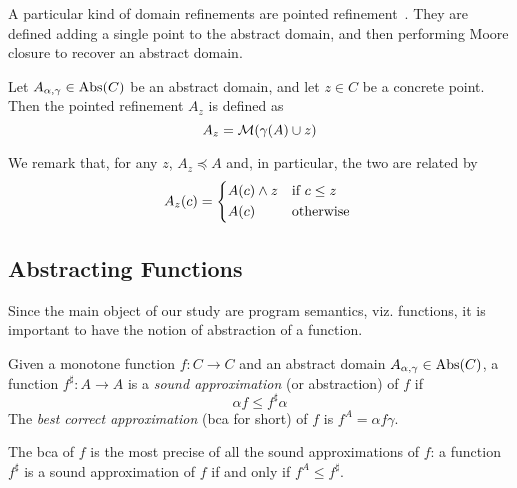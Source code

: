 A particular kind of domain refinements are pointed refinement~\cite{BGGR22}. They are defined adding a single point to the abstract domain, and then performing Moore closure to recover an abstract domain.
\begin{definition}
	Let $A_{\alpha, \gamma} \in \text{\normalfont Abs}(C)$ be an abstract domain, and let $z \in C$ be a concrete point. Then the pointed refinement $A_z$ is defined as
	\[
	A_z = \mathcal{M}(\gamma(A) \cup z)
	\]
\end{definition}
We remark that, for any $z$, $A_z \preceq A$ and, in particular, the two are related by
\[
A_z(c) = \begin{cases*}
	A(c) \wedge z & if $c \le z$ \\
	A(c)          & otherwise
\end{cases*}
\]

\subsection{Abstracting Functions}
Since the main object of our study are program semantics, viz. functions, it is important to have the notion of abstraction of a function.
\begin{definition}
	Given a monotone function $f : C \rightarrow C$ and an abstract domain $A_{\alpha, \gamma} \in \text{\normalfont Abs}(C)$, a function $f^{\sharp} : A \rightarrow A$ is a \emph{sound approximation} (or abstraction) of $f$ if
	\[
	\alpha f \le f^{\sharp} \alpha
	\]
	The \emph{best correct approximation} (bca for short) of $f$ is $f^{A} = \alpha f \gamma$.
\end{definition}
The bca of $f$ is the most precise of all the sound approximations of $f$: a function $f^{\sharp}$ is a sound approximation of $f$ if and only if $f^{A} \le f^{\sharp}$.

